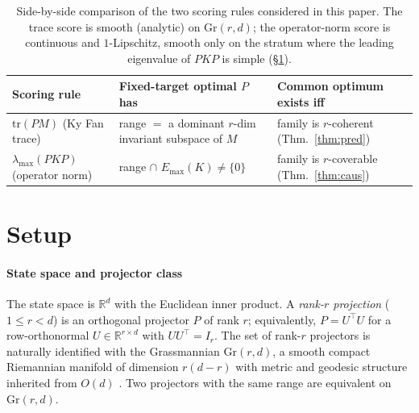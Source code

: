 \documentclass[final,3p,times]{elsarticle}
\newcommand{\Gr}{\mathrm{Gr}}
\newcommand{\tr}{\mathrm{tr}}
\newcommand{\R}{\mathbb{R}}
\newcommand{\Emax}{E_{\max}}
\begin{document}
\begin{table}[tbp]
\caption{Side-by-side comparison of the two scoring rules considered in
this paper. The trace score is smooth (analytic) on $\Gr(r,d)$; the
operator-norm score is continuous and $1$-Lipschitz, smooth only on the
stratum where the leading eigenvalue of $PKP$ is simple
(\S\ref{sec:setup}).}
\label{tab:compare}
\begin{center}
\begin{tabular}{lll}
\toprule
Scoring rule & Fixed-target optimal $P$ has & Common optimum exists iff \\
\midrule
$\tr(PM)$ (Ky Fan trace) &
range $=$ a dominant $r$-dim invariant subspace of $M$ &
family is $r$-coherent (Thm.~\ref{thm:pred}) \\
$\lambda_{\max}(PKP)$ (operator norm) &
range $\cap$ $\Emax(K)\ne\{0\}$ &
family is $r$-coverable (Thm.~\ref{thm:caus}) \\
\bottomrule
\end{tabular}
\end{center}
\end{table}

\section{Setup}
\label{sec:setup}

\paragraph{State space and projector class}
The state space is $\R^d$ with the Euclidean inner product.
A \emph{rank-$r$ projection} ($1 \le r < d$) is an orthogonal projector
$P$ of rank $r$; equivalently, $P = U^\top U$ for a row-orthonormal
$U \in \R^{r\times d}$ with $UU^\top = I_r$.
The set of rank-$r$ projectors is naturally identified with the
Grassmannian $\Gr(r,d)$, a smooth compact Riemannian manifold of
dimension $r(d-r)$ with metric and geodesic structure inherited from
$O(d)$ \cite{Edelman1998}.
Two projectors with the same range are equivalent on $\Gr(r,d)$.
\end{document}
